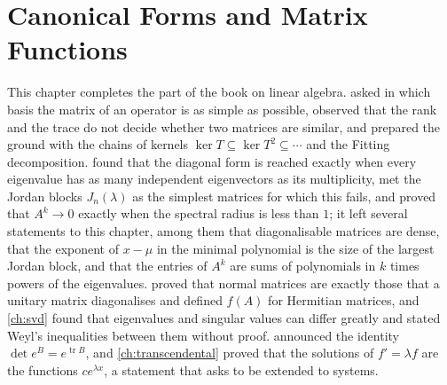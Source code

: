 \chapter{Canonical Forms and Matrix Functions}
\label{ch:canonical-forms}


This chapter completes the part of the book on linear algebra.  asked in which basis the matrix of an operator is as simple as possible, observed that the rank and the trace do not decide whether two matrices are similar, and prepared the ground with the chains of kernels $\ker T\subseteq\ker T^2\subseteq\cdots$ and the Fitting decomposition.  found that the diagonal form is reached exactly when every eigenvalue has as many independent eigenvectors as its multiplicity, met the Jordan blocks $J_n(\lambda)$ as the simplest matrices for which this fails, and proved that $A^k\to0$ exactly when the spectral radius is less than $1$; it left several statements to this chapter, among them that diagonalisable matrices are dense, that the exponent of $x-\mu$ in the minimal polynomial is the size of the largest Jordan block, and that the entries of $A^k$ are sums of polynomials in $k$ times powers of the eigenvalues.  proved that normal matrices are exactly those that a unitary matrix diagonalises and defined $f(A)$ for Hermitian matrices, and \cref{ch:svd} found that eigenvalues and singular values can differ greatly and stated Weyl's inequalities between them without proof.  announced the identity $\det e^B=e^{\operatorname{tr}B}$, and \cref{ch:transcendental} proved that the solutions of $f'=\lambda f$ are the functions $ce^{\lambda x}$, a statement that asks to be extended to systems.

